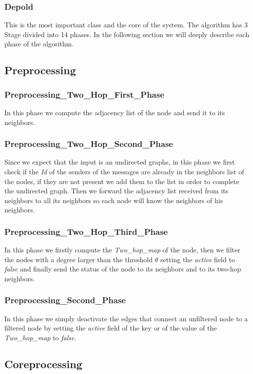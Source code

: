 \documentclass[12pt]{article}
\begin{document}
\subsubsection{Depold}
This is the most important class and the core of the system. The algorithm has 3 Stage divided into 14 phases. In the following section we will deeply describe each phase of the algorithm.
\subsection{Preprocessing}
\subsubsection{Preprocessing\_Two\_Hop\_First\_Phase}
In this phase we compute the adjacency list of the node and send it to its neighbors.
\subsubsection{Preprocessing\_Two\_Hop\_Second\_Phase}
Since we expect that the input is an undirected graphs, in this phase we first check if the \emph{Id} of the senders of the messages are already in the neighbors list of the nodes, if they are not present we add them to the list in order to complete the undirected graph.
Then we forward the adjacency list received from its neighbors to all its neighbors so each node will know the neighbors of his neighbors.
\subsubsection{Preprocessing\_Two\_Hop\_Third\_Phase}
In this phase we firstly compute the \emph{Two\_hop\_map} of the node, then we filter the nodes with a degree larger than the threshold $\theta$ setting the \emph{active} field to \emph{false} and finally send the status of the node to its neighbors and to its two-hop neighbors.
\subsubsection{Preprocessing\_Second\_Phase}
In this phase we simply deactivate the edges that connect an unfiltered node to a filtered node by setting the \emph{active} field of the key or of the value of the \emph{Two\_hop\_map} to \emph{false}.
\subsection{Coreprocessing}
\end{document}

